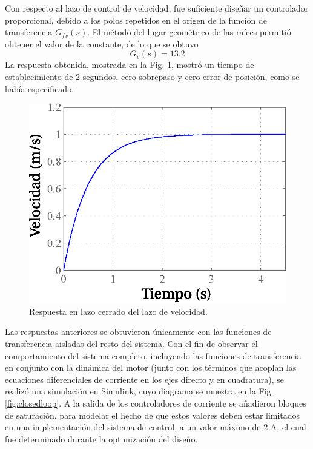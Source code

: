 Con respecto al lazo de control de velocidad, fue suficiente diseñar un controlador proporcional, debido a los polos repetidos en el origen de la función de transferencia $G_{fx}(s)$. El método del lugar geométrico de las raíces permitió obtener el valor de la constante, de lo que se obtuvo
\begin{equation}
G_v(s) = 13.2
\end{equation}
La respuesta obtenida, mostrada en la Fig. \ref{fig:closedloopspeed}, mostró un tiempo de establecimiento de 2 segundos, cero sobrepaso y cero error de posición, como se había especificado.

\begin{figure}[hbtp]
\centering
\includegraphics[scale=0.8]{../img/Diseno_de_un_controlador_de_velocidad/closedloopspeed.eps}
\caption{Respuesta en lazo cerrado del lazo de velocidad.}
\label{fig:closedloopspeed}
\end{figure}

Las respuestas anteriores se obtuvieron únicamente con las funciones de transferencia aisladas del resto del sistema. Con el fin de observar el comportamiento del sistema completo, incluyendo las funciones de transferencia en conjunto con la dinámica del motor (junto con los términos que acoplan las ecuaciones diferenciales de corriente en los ejes directo y en cuadratura), se realizó una simulación en Simulink, cuyo diagrama se muestra en la Fig. \ref{fig:closedloop}. A la salida de los controladores de corriente se añadieron bloques de saturación, para modelar el hecho de que estos valores deben estar limitados en una implementación del sistema de control, a un valor máximo de 2 A, el cual fue determinado durante la optimización del diseño.

